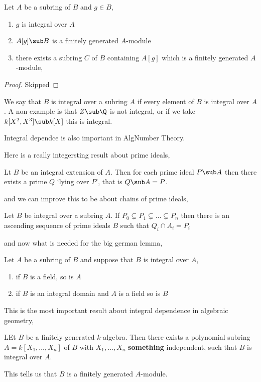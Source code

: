 
\begin{nlemma}
  Let $A$ be a subring of $B$ and $g \in B$,
  \begin{enumerate}
    \item $g$ is integral over $A$
    \item $A[g] \sub B$ is a finitely generated $A$-module
    \item there exists a subring $C$ of $B$ containing $A[g]$ which is a finitely generated $A$-module,
  \end{enumerate}
\end{nlemma}
\begin{proof}
  Skipped
\end{proof}

\noindent
We say that $B$ is integral over a subring $A$ if every element of $B$ is integral over $A$. A non-example is that $Z \sub \Q$ is not integral, or if we take $k[X^2, X^3] \sub k[X]$ this is integral.

\begin{remark}
   Integral dependce is also important in AlgNumber Theory.
\end{remark}

Here is a really integersting result about prime ideals,
\begin{nprop}
  Lt $B$ be an integral extension of $A$. Then for each prime ideal $P \sub A$ then there exists a prime $Q$ `lying over $P$', that is $Q\sub A = P$.
\end{nprop}
and we can improve this to be about chains of prime ideals,
\begin{nprop}
 Let $B$ be integral over a subring $A$. If $P_0 \subsetneq P_1 \subsetneq \dots \subsetneq P_n$ then there is an ascending sequence of prime ideals $B$ such that $Q_i \cap A_i = P_i$
\end{nprop}

\noindent
and now what is needed for the big german lemma,
\begin{ncor}
   Let $A$ be a subring of $B$ and suppose that $B$ is integral over $A$,
   \begin{enumerate}
     \item if $B$ is a field, so is $A$
     \item if $B$ is an integral domain and $A$ is a field so is $B$
   \end{enumerate}
\end{ncor}

\noindent
This is the most important result about integral dependence in algebraic geometry,
\begin{nprop}
  LEt $B$ be a finitely generated $k$-algebra. Then there exists a polynomial subring $A = k[X_1, \dots, X_n]$ of $B$ with $X_1, \dots, X_n$ \textbf{something} independent, such that $B$ is integral over $A$.
\end{nprop}
\noindent
This tells us that $B$ is a finitely generated $A$-module.


